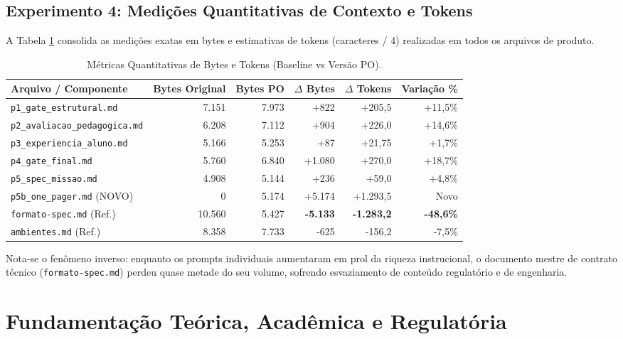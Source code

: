 \documentclass[11pt,a4paper]{article}
\begin{document}
\subsection{Experimento 4: Medições Quantitativas de Contexto e Tokens}
A Tabela \ref{tab:tokens} consolida as medições exatas em bytes e estimativas de tokens (caracteres / 4) realizadas em todos os arquivos de produto.

\begin{table}[htbp]
\centering
\small
\begin{tabular}{l r r r r r}
\toprule
\textbf{Arquivo / Componente} & \textbf{Bytes Original} & \textbf{Bytes PO} & \textbf{$\Delta$ Bytes} & \textbf{$\Delta$ Tokens} & \textbf{Variação \%} \\
\midrule
\texttt{p1\_gate\_estrutural.md} & 7.151 & 7.973 & +822 & +205,5 & +11,5\% \\
\texttt{p2\_avaliacao\_pedagogica.md} & 6.208 & 7.112 & +904 & +226,0 & +14,6\% \\
\texttt{p3\_experiencia\_aluno.md} & 5.166 & 5.253 & +87 & +21,75 & +1,7\% \\
\texttt{p4\_gate\_final.md} & 5.760 & 6.840 & +1.080 & +270,0 & +18,7\% \\
\texttt{p5\_spec\_missao.md} & 4.908 & 5.144 & +236 & +59,0 & +4,8\% \\
\texttt{p5b\_one\_pager.md} (NOVO) & 0 & 5.174 & +5.174 & +1.293,5 & Novo \\
\midrule
\texttt{formato-spec.md} (Ref.) & 10.560 & 5.427 & \textbf{-5.133} & \textbf{-1.283,2} & \textbf{-48,6\%} \\
\texttt{ambientes.md} (Ref.) & 8.358 & 7.733 & -625 & -156,2 & -7,5\% \\
\bottomrule
\end{tabular}
\caption{Métricas Quantitativas de Bytes e Tokens (Baseline vs Versão PO).}
\label{tab:tokens}
\end{table}

Nota-se o fenômeno inverso: enquanto os prompts individuais aumentaram em prol da riqueza instrucional, o documento mestre de contrato técnico (\texttt{formato-spec.md}) perdeu quase metade do seu volume, sofrendo esvaziamento de conteúdo regulatório e de engenharia.

\section{Fundamentação Teórica, Acadêmica e Regulatória}
\end{document}
